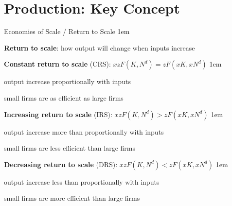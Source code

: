 \documentclass[11pt,aspectratio=43,usenames,dvipsnames]{beamer}
\let\olditemize=\itemize
\let\endolditemize=\enditemize
\renewenvironment{itemize}{\olditemize \itemsep1em}{\endolditemize}
\theoremstyle{definition}
\begin{document}
\section[Production]{Production: Key Concept}
\label{sec:Production__Key_Concept}

\begin{frame}{Economies of Scale / Return to Scale}
\label{slide:Economies_of_Scale___Return_to_Scale}
\begin{itemize}
    \item \textbf{Return to scale}: how output will change when inputs increase
    \item \textbf{Constant return to scale} (CRS): $ x z F( K, N^{d} ) = z F( xK, xN^{d} ) $
    \begin{itemize}
        \item output increase \alert{proportionally} with inputs
        \item small firms are \alert{as efficient as} large firms
    \end{itemize}
    \item \textbf{Increasing return to scale} (IRS): $ x z F( K, N^{d} ) > z F( xK, xN^{d} ) $
    \begin{itemize}
        \item output increase \alert{more than proportionally} with inputs
        \item small firms are \alert{less efficient than} large firms
    \end{itemize}
    \item \textbf{Decreasing return to scale} (DRS): $ x z F( K, N^{d} ) < z F( xK, xN^{d} ) $
    \begin{itemize}
        \item output increase \alert{less than proportionally} with inputs
        \item small firms are \alert{more efficient than} large firms
    \end{itemize}
\end{itemize}
\end{frame}
\end{document}

